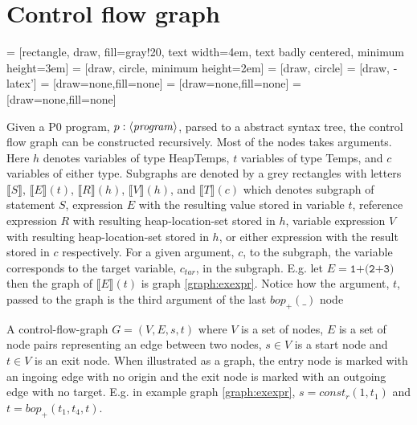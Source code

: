 \section{Control flow graph}
 = [rectangle, draw, fill=gray!20, text width=4em, text badly centered, minimum height=3em]
 = [draw, circle, minimum height=2em]
 = [draw, circle]
 = [draw, -latex']
 = [draw=none,fill=none]
 = [draw=none,fill=none]
 = [draw=none,fill=none]
\newcommand{\subt}[1]{\llbracket #1\rrbracket}

Given a P0 program, $p : \langle\mathit{program}\rangle$, parsed to a abstract syntax tree, the control flow graph can be constructed recursively. Most of the nodes takes arguments. Here $h$ denotes variables of type HeapTemps, $t$ variables of type Temps, and $c$ variables of either type. Subgraphs are denoted by a grey rectangles with letters $\subt{S}$, $\subt{E}(t)$, $\subt{R}(h)$, $\subt{V}(h)$, and $\subt{T}(c)$ which denotes subgraph of statement $S$, expression $E$ with the resulting value stored in variable $t$, reference expression $R$ with resulting heap-location-set stored in $h$, variable expression $V$ with resulting heap-location-set stored in $h$, or either expression with the result stored in $c$ respectively. For a given argument, $c$, to the subgraph, the variable corresponds to the target variable, $c_{tar}$, in the subgraph. E.g. let  $E = \texttt{1+(2+3)}$ then the graph of $\subt{E}(t)$ is graph \ref{graph:exexpr}. Notice how the argument, $t$, passed to the graph is the third argument of the last $\mathit{bop}_+(\_)$ node
\begin{definition}
\label{def:cfg}
A control-flow-graph $G = (V,E, s, t)$ where $V$ is a set of nodes, $E$ is a set of node pairs representing an edge between two nodes, $s\in V$ is a start node and $t\in V$ is an exit node. When illustrated as a graph, the entry node is marked with an ingoing edge with no origin and the exit node is marked with an outgoing edge with no target. E.g. in example graph \ref{graph:exexpr}, $s = \mathit{const}_r(1, t_1)$ and $t = \mathit{bop}_+(t_1, t_4, t)$.
\end{definition}

